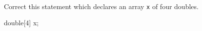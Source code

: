 Correct this statement which declares an array \texttt{x} of four doubles.

\begin{consolethree}[escapeinside=||]

double[4] x; 

\end{consolethree}

